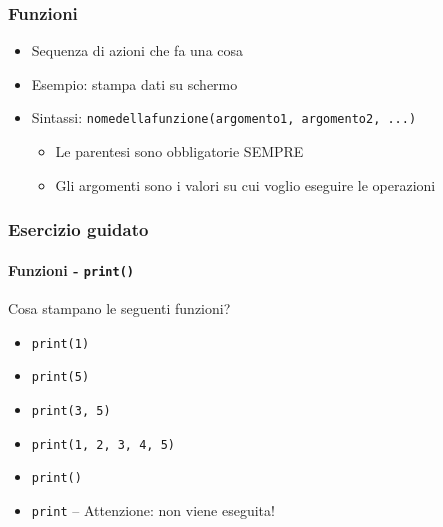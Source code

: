 
\begin{contentframe}
    \frametitle{Funzioni}

    \begin{itemize}
        \item Sequenza di azioni che fa una cosa

        \bigskip
        \item Esempio:  stampa dati su schermo

        \bigskip
        \item Sintassi: \texttt{nomedellafunzione(argomento1, argomento2, ...)}
        \begin{itemize}
            \item Le parentesi sono obbligatorie SEMPRE
            \item Gli argomenti sono i valori su cui voglio eseguire le operazioni
        \end{itemize}
    \end{itemize}
\end{contentframe}

\begin{exerciseframe}
    \frametitle{Esercizio guidato}
    \framesubtitle{Funzioni - \texttt{print()}}

    Cosa stampano le seguenti funzioni?
    \begin{itemize}
        \item \texttt{print(1)}\pause
        \item \texttt{print(5)}\pause
        \item \texttt{print(3, 5)}\pause
        \item \texttt{print(1, 2, 3, 4, 5)}\pause
        \item \texttt{print()}\pause
        \item \texttt{print}\pause{} -- Attenzione: non viene eseguita!
    \end{itemize}
\end{exerciseframe}

